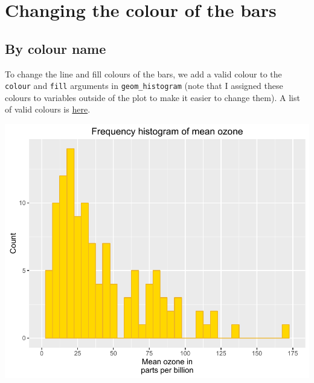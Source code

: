 \section{Changing the colour of the
bars}\label{changing-the-colour-of-the-bars}

\subsection{By colour name}\label{by-colour-name}

To change the line and fill colours of the bars, we add a valid colour
to the \texttt{colour} and \texttt{fill} arguments in
\texttt{geom\_histogram} (note that I assigned these colours to
variables outside of the plot to make it easier to change them). A list
of valid colours is
\href{http://www.stat.columbia.edu/~tzheng/files/Rcolor.pdf}{here}.

\begin{Shaded}
\begin{Highlighting}[]

\StringTok{ }\NormalTok{(} \StringTok{ }
\StringTok{  }\NormalTok{(}\NormalTok{(}  \NormalTok{,}
      
\StringTok{  }\NormalTok{(} \NormalTok{,}
     \NormalTok{(}\NormalTok{, }\NormalTok{, }\NormalTok{), }\NormalTok{(}\NormalTok{, }\NormalTok{)) +}
\StringTok{  }\NormalTok{(} \NormalTok{) +}
\StringTok{  }\NormalTok{(}\NormalTok{)}
\end{Highlighting}
\end{Shaded}

\begin{center}\includegraphics[width=0.6\linewidth]{7_Histograms_pdf/histogram_9-1} \end{center}

